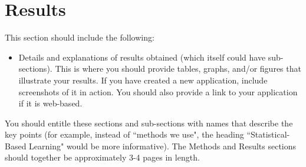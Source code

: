 \section{Results}

This section should include the following:

\begin{itemize}

	
	\item Details and explanations of results obtained (which itself could have
		sub-sections). This is where you should provide tables, graphs, and/or
		figures that illustrate your results. If you have created a new
		application, include screenshots of it in action. You should also provide a
		link to your application if it is web-based.

\end{itemize}

You should entitle these sections and sub-sections with names that describe the
key points (for example, instead of ``methods we use", the heading
``Statistical-Based Learning" would be more informative). The Methods and
Results sections should together be approximately 3-4 pages in length.